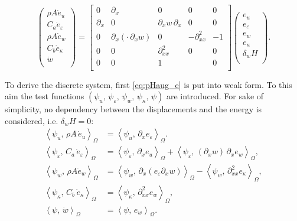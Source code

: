 \documentclass{ifacconf}
\newcommand{\inner}[3][]{\ensuremath{\left\langle #2, \, #3 \right\rangle_{#1}}}
\begin{document}
\begin{equation}\label{eq:pHaug_e}
	\begin{pmatrix}
		\rho A \dot{e}_u \\
		C_a \dot{e}_\varepsilon \\
		\rho A \dot{e}_w \\
		C_b \dot{e}_\kappa \\
		\dot{w} \\
	\end{pmatrix} = 
	\begin{bmatrix}
		0 & \partial_x & 0 & 0 & 0\\
		\partial_x & 0 & \partial_x w \, \partial_x & 0 & 0 \\
		0 & \partial_x(\cdot \, \partial_x w) & 0 & -\partial_{xx}^2 & -1 \\
		0 & 0 & \partial_{xx}^2 & 0 & 0 \\ 
		0 & 0 & 1 &  & 0 \\
	\end{bmatrix}
	\begin{pmatrix}
		e_u \\
		e_\varepsilon \\
		e_w \\
		e_\kappa \\
		\delta_w H \\
	\end{pmatrix}.
\end{equation}

To derive the discrete system, first \eqref{eq:pHaug_e} is put into weak form. To this aim the test functions $(\psi_u,\, \psi_\varepsilon,\, \psi_w,\, \psi_\kappa,\, \psi)$ are introduced. For sake of simplicity, no dependency between the displacements and the energy is considered, i.e. $\delta_w H=0$:
\begin{equation}
	\begin{aligned}
	\inner[\Omega]{\psi_u}{\rho A \, \dot{e}_u} &= \inner[\Omega]{\psi_u}{\partial_x e_\varepsilon}. \\
	\inner[\Omega]{\psi_\varepsilon}{C_a \, \dot{e}_\varepsilon} &= \inner[\Omega]{\psi_\varepsilon}{\partial_x e_u} + \inner[\Omega]{\psi_\varepsilon}{(\partial_x w) \, \partial_x e_w}, \\
	\inner[\Omega]{\psi_w}{\rho A\dot{e}_w} &= \inner[\Omega]{\psi_w}{\partial_x(e_\varepsilon \partial_x w)} - \inner[\Omega]{\psi_w}{\partial^2_{xx} e_\kappa}, \\
	\inner[\Omega]{\psi_\kappa}{C_b \, \dot{e}_\kappa} &= \inner[\Omega]{\psi_\kappa}{\partial^2_{xx} e_w}, \\
	\inner[\Omega]{\psi}{\dot{w}} &= \inner[\Omega]{\psi}{e_w}. \\
	\end{aligned}
\end{equation}
\end{document}
